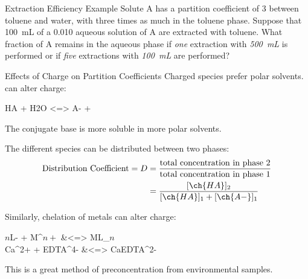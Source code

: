\documentclass[notes=only]{beamer}
\begin{document}
\begin{frame}[t]{Extraction Efficiency Example}
	Solute A has a partition coefficient of 3 between toluene and water,
	with three times as much in the toluene phase. Suppose that
	\SI{100}{\milli\liter} of a \SI{0.010}{\Molar} aqueous solution of A are
	extracted with toluene. What fraction of A remains in the aqueous phase
	if \emph{one} extraction with \emph{\SI{500}{\mL}} is performed or if
	\emph{five} extractions with \emph{\SI{100}{\mL}} are performed?
\end{frame}


	\begin{frame}[allowframebreaks]{Effects of Charge on Partition Coefficients}
	Charged species prefer polar solvents. \pH can alter charge:
	\begin{reaction*}
		HA + H2O <=> A- + \Oxo 
	\end{reaction*}
	The conjugate base is more soluble in more polar solvents.

	The different species can be \alert{distributed} between two phases:
	\begin{align*}
		\text{Distribution Coefficient}
		= D &= \frac{\text{total
		concentration in phase
		2}}{\text{total concentration in
		phase 1}} \\
		&=
		\frac{[\ch{HA}]_2}{[\ch{HA}]_1 +
		[\ch{A-}]_1}
	\end{align*}

	\framebreak
        Similarly, chelation of metals can alter charge:
	\begin{reactions*}
		$n$L- + M^{$n+$} &<=> ML_{$n$} \\
		Ca^2+ + EDTA^4- &<=> CaEDTA^2-
	\end{reactions*}
	This is a great method of \alert{preconcentration} from
	environmental samples.
\end{frame}
\end{document}
